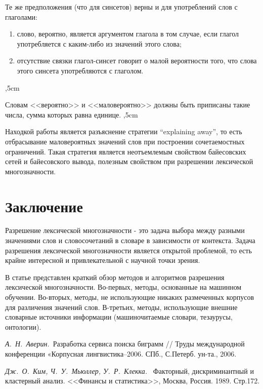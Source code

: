 \documentclass{article}
\begin{document}
\begin{articletext}
Те же предположения (что для синсетов) верны и для употреблений слов с глаголами:
\begin{enumerate}
\item слово, вероятно, является аргументом глагола в том случае, если глагол употребляется с каким-либо из значений этого слова;
\item отсутствие связки глагол-синсет говорит о малой вероятности того, что слова этого синсета употребляются с глаголом.
\end{enumerate}
,5cm

Словам <<вероятно>> и <<маловероятно>> должны быть приписаны такие числа, сумма которых равна единице. 
,5cm

Находкой работы \cite{Ciaramita 2000} является разъяснение стратегии “explaining away”, то есть отбрасывание маловероятных значений слов при построении сочетаемостных ограничений. Такая стратегия является неотъемлемым свойством байесовских сетей и байесовского вывода, полезным свойством при разрешении лексической многозначности. 

\section{Заключение}

Разрешение лексической многозначности - это задача выбора между разными значениями слов и словосочетаний в словаре в зависимости от контекста. Задача разрешения лексической многозначности является открытой проблемой, то есть крайне интересной и привлекательной с научной точки зрения.

В статье представлен краткий обзор методов и алгоритмов разрешения лексической многозначности. Во-первых, методы, основанные на машинном обучении.  Во-вторых, методы, не использующие никаких размеченных корпусов для различения значений слов. В-третьих, методы, использующие внешние словарные источники информации (машиночитаемые словари, тезаурусы, онтологии).
 
\begin{thebibliography}{9}

\textit{А.~Н.~Аверин.~}Разработка сервиса поиска биграмм // Труды международной конференции «Корпусная лингвистика–2006. СПб., С.Петерб. ун-та., 2006.

\textit{Дж.~О.~Ким, Ч.~У.~Мьюллер, У.~Р.~Клекка.~} Факторный, дискриминантный и кластерный анализ. <<Финансы и статистика>>, Москва, Россия. 1989. Стр.172.


\end{thebibliography}
\end{articletext}
\end{document}

